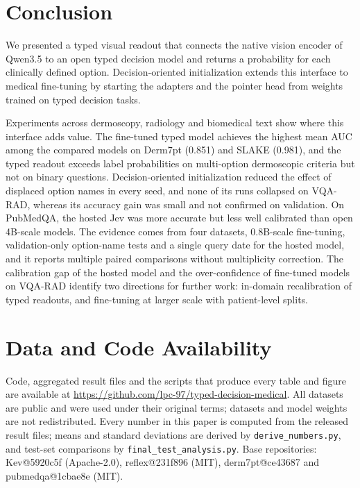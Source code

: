 \documentclass{article}
\begin{document}
\section{Conclusion}
We presented a typed visual readout that connects the native vision encoder of Qwen3.5 to an open typed decision model and returns a probability for each clinically defined option. Decision-oriented initialization extends this interface to medical fine-tuning by starting the adapters and the pointer head from weights trained on typed decision tasks.

Experiments across dermoscopy, radiology and biomedical text show where this interface adds value. The fine-tuned typed model achieves the highest mean AUC among the compared models on Derm7pt (0.851) and SLAKE (0.981), and the typed readout exceeds label probabilities on multi-option dermoscopic criteria but not on binary questions. Decision-oriented initialization reduced the effect of displaced option names in every seed, and none of its runs collapsed on VQA-RAD, whereas its accuracy gain was small and not confirmed on validation. On PubMedQA, the hosted Jev was more accurate but less well calibrated than open 4B-scale models. The evidence comes from four datasets, 0.8B-scale fine-tuning, validation-only option-name tests and a single query date for the hosted model, and it reports multiple paired comparisons without multiplicity correction. The calibration gap of the hosted model and the over-confidence of fine-tuned models on VQA-RAD identify two directions for further work: in-domain recalibration of typed readouts, and fine-tuning at larger scale with patient-level splits.

\section*{Data and Code Availability}
Code, aggregated result files and the scripts that produce every table and figure are available at \url{https://github.com/lpc-97/typed-decision-medical}. All datasets are public and were used under their original terms; datasets and model weights are not redistributed. Every number in this paper is computed from the released result files; means and standard deviations are derived by \texttt{derive\_numbers.py}, and test-set comparisons by \texttt{final\_test\_analysis.py}. Base repositories: Kev@5920c5f (Apache-2.0), reflex@231f896 (MIT), derm7pt@ce43687 and pubmedqa@1cbae8e (MIT).
\end{document}
